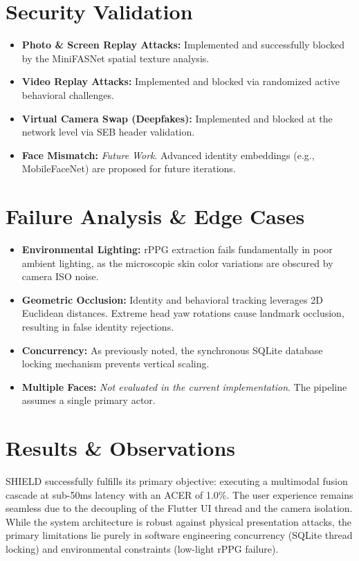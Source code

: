 \documentclass[12pt, a4paper]{report}
\begin{document}
\section{Security Validation}
\begin{itemize}
    \item \textbf{Photo \& Screen Replay Attacks:} Implemented and successfully blocked by the MiniFASNet spatial texture analysis.
    \item \textbf{Video Replay Attacks:} Implemented and blocked via randomized active behavioral challenges.
    \item \textbf{Virtual Camera Swap (Deepfakes):} Implemented and blocked at the network level via SEB header validation.
    \item \textbf{Face Mismatch:} \textit{Future Work}. Advanced identity embeddings (e.g., MobileFaceNet) are proposed for future iterations.
\end{itemize}

\section{Failure Analysis \& Edge Cases}
\begin{itemize}
    \item \textbf{Environmental Lighting:} rPPG extraction fails fundamentally in poor ambient lighting, as the microscopic skin color variations are obscured by camera ISO noise.
    \item \textbf{Geometric Occlusion:} Identity and behavioral tracking leverages 2D Euclidean distances. Extreme head yaw rotations cause landmark occlusion, resulting in false identity rejections.
    \item \textbf{Concurrency:} As previously noted, the synchronous SQLite database locking mechanism prevents vertical scaling.
    \item \textbf{Multiple Faces:} \textit{Not evaluated in the current implementation}. The pipeline assumes a single primary actor.
\end{itemize}

\section{Results \& Observations}
SHIELD successfully fulfills its primary objective: executing a multimodal fusion cascade at sub-50ms latency with an ACER of 1.0\%. The user experience remains seamless due to the decoupling of the Flutter UI thread and the camera isolation. While the system architecture is robust against physical presentation attacks, the primary limitations lie purely in software engineering concurrency (SQLite thread locking) and environmental constraints (low-light rPPG failure).
\end{document}
